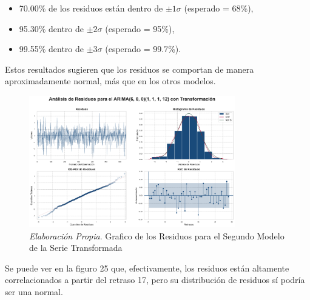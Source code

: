 \documentclass[12pt,letterpaper]{article}   %
\begin{document}
\begin{itemize}
    \item 70.00\% de los residuos están dentro de $\pm1\sigma$ (esperado = 68\%),
    \item 95.30\% dentro de $\pm2\sigma$ (esperado = 95\%),
    \item 99.55\% dentro de $\pm3\sigma$ (esperado = 99.7\%).
\end{itemize}

Estos resultados sugieren que los residuos se comportan de manera aproximadamente normal, más que en los otros modelos.

\begin{figure}[ht]
    \centering
    \includegraphics[width=0.8\textwidth]{imagenes/04-05-analisis-de-residuos-m3.pdf}
    \caption{\textit{Elaboración Propia}. Grafico de los Residuos para el Segundo Modelo de la Serie Transformada}
\end{figure}

Se puede ver en la figuro 25 que, efectivamente, los residuos están altamente correlacionados a partir del retraso 17, pero su distribución de residuos sí podría ser una normal.

































\newpage
$\quad$
\newpage
\end{document}
